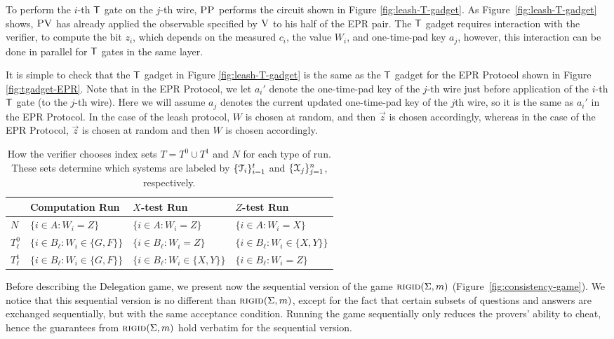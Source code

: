 To perform the $i$-th $\sf T$ gate on the $j$-th wire, $\textsc{PP}$ performs the circuit shown in Figure \ref{fig:leash-T-gadget}. As Figure~\ref{fig:leash-T-gadget} shows, $\textsc{PV}$ has already applied the observable specified by $\textsc{V}$ to his half of the EPR pair. The $\sf T$ gadget requires interaction with the verifier, to compute the bit $z_i$, which depends on the measured $c_i$, the value $W_i$, and one-time-pad key $a_j$, however, this interaction can be done in parallel for $\sf T$ gates in the same layer. 


It is simple to check that the $\sf T$ gadget in Figure \ref{fig:leash-T-gadget} is the same as the $\sf T$ gadget for the EPR Protocol shown in Figure \ref{fig:tgadget-EPR}. Note that in the EPR Protocol, we let $a_i'$ denote the one-time-pad key of the $j$-th wire just before application of the $i$-th $\sf T$ gate (to the $j$-th wire). Here we will assume $a_j$ denotes the current updated one-time-pad key of the $j$th wire, so it is the same as $a_i'$ in the EPR Protocol. In the case of the leash protocol, $W$ is chosen at random, and then $\vec{z}$ is chosen accordingly, whereas in the case of the EPR Protocol, $\vec{z}$ is chosen at random and then $W$ is chosen accordingly. 




\begin{table}[H]
\centering
\setlength\tabcolsep{1.5pt}
\begin{tabular}{|l|lll|}
\hline
& Computation Run & $X$-test Run & $Z$-test Run\\
\hline
$N$ %
& $\{i\in A:W_i=Z\}$ & $\{i\in A:W_i=Z\}$ & $\{i\in A:W_i=X\}$\\
$T^0_{\ell}$ %
& $\{i\in B_{\ell}:W_i\in \{G,F\}\}$ & $\{i\in B_{\ell}:W_i=Z\}$ & $\{i\in B_{\ell}:W_i\in \{X,Y\}\}$ \\
$T^1_{\ell}$ %
& $\{i\in B_{\ell}:W_i\in \{G,F\}\}$ & $\{i\in B_{\ell}:W_i\in \{X,Y\}\}$ & $\{i\in B_{\ell}:W_i=Z\}$ \\
\hline
\end{tabular}
\caption{How the verifier chooses index sets $T=T^0\cup T^1$ and $N$ for each type of run. These sets determine which systems are labeled by $\{{\cal T}_{i}\}_{i=1}^t$ and $\{{\cal X}_{j}\}_{j=1}^n$, respectively.}\label{tab:index-choices}
\end{table}

\noindent  Before describing the Delegation game, we present now the sequential version of the game $\textsc{rigid}(\Sigma,m)$ (Figure~\ref{fig:consistency-game}). We notice that this sequential version is no different than $\textsc{rigid}(\Sigma,m)$, except for the fact that certain subsets of questions and answers are exchanged sequentially, but with the same acceptance condition. Running the game sequentially only reduces the provers' ability to cheat, hence the guarantees from $\textsc{rigid}(\Sigma,m)$ 
hold verbatim for the sequential version. 


